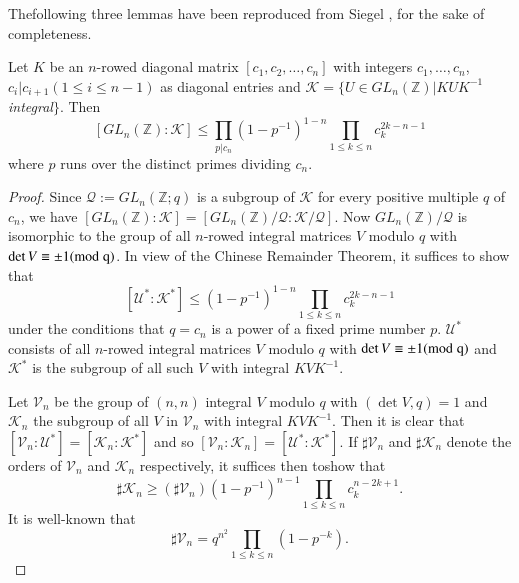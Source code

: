 The\pageoriginale following three lemmas have been reproduced from
Siegel \cite{key25}, for the sake of completeness.

\begin{sublemma}\label{c1:lem-1.4.7}
Let $K$ be an $n$-rowed diagonal matrix $[c_{1},c_{2},\ldots,c_{n}]$
with integers $c_{1},\ldots,c_{n}$, $c_{i}|c_{i+1}(1\leq i\leq n-1)$
as diagonal entries and $\mathscr{K}=\{U\in
GL_{n}(\mathbb{Z})|KUK^{-1}$ {\em integral}$\}$. Then
$$
[GL_{n}(\mathbb{Z}):\mathscr{K}]\leq
\prod\limits_{p|c_{n}}(1-p^{-1})^{1-n}\prod_{1\leq k\leq
  n}c^{2k-n-1}_{k} 
$$
where $p$ runs over the distinct primes dividing $c_{n}$.
\end{sublemma}

\begin{proof}
Since $\mathcal{Q}:=GL_{n}(\mathbb{Z};q)$ is a subgroup of
$\mathscr{K}$ for every positive multiple $q$ of $c_{n}$, we have
$[GL_{n}(\mathbb{Z}):\mathscr{K}]=[GL_{n}(\mathbb{Z})/\mathcal{Q}:\mathscr{K}/\mathcal{Q}]$. Now
$GL_{n}(\mathbb{Z})/\mathcal{Q}$ is isomorphic to the group of all
$n$-rowed integral matrices $V$ modulo $q$ with $\det V\equiv \pm
1(\rm{mod} \; q)$. In view of the Chinese Remainder Theorem, it suffices to
show that
$$
[\mathscr{U}^{\ast}:\mathscr{K}^{\ast}]\leq
(1-p^{-1})^{1-n}\prod\limits_{1\leq k\leq n}c^{2k-n-1}_{k}
$$
under the conditions that $q=c_{n}$ is a power of a fixed prime number
$p$. $\mathscr{U}^{\ast}$ consists of all $n$-rowed integral matrices
$V$ modulo $q$ with $\det V\equiv \pm 1(\rm{mod} \; q)$ and
$\mathscr{K}^{\ast}$ is the subgroup of all such $V$ with integral
$KVK^{-1}$.

Let $\mathscr{V}_{n}$ be the group of $(n,n)$ integral $V$ modulo $q$
with $(\det V,q)=1$ and $\mathscr{K}_{n}$ the subgroup of all $V$ in
$\mathscr{V}_{n}$ with integral $KVK^{-1}$. Then it is clear that
$[\mathscr{V}_{n}:\mathscr{U}^{\ast}]=[\mathscr{K}_{n}:\mathscr{K}^{\ast}]$
and so
$[\mathscr{V}_{n}:\mathscr{K}_{n}]=[\mathscr{U}^{\ast}:\mathscr{K}^{\ast}]$. If
$\sharp \mathscr{V}_{n}$ and $\sharp \mathscr{K}_{n}$ denote the
orders of $\mathscr{V}_{n}$ and $\mathscr{K}_{n}$ respectively, it
suffices then to\pageoriginale show that
\begin{equation*}
\sharp \mathscr{K}_{n}\geq (\sharp
\mathscr{V}_{n})(1-p^{-1})^{n-1}\prod_{1\leq k\leq
  n}c^{n-2k+1}_{k}.\tag{31}\label{c1:eq31} 
\end{equation*}
It is well-known that
\begin{equation*}
\sharp\mathscr{V}_{n}=q^{n^{2}}\prod\limits_{1\leq k\leq
  n}(1-p^{-k}).\tag{32}\label{c1:eq32} 
\end{equation*}


\end{proof}
